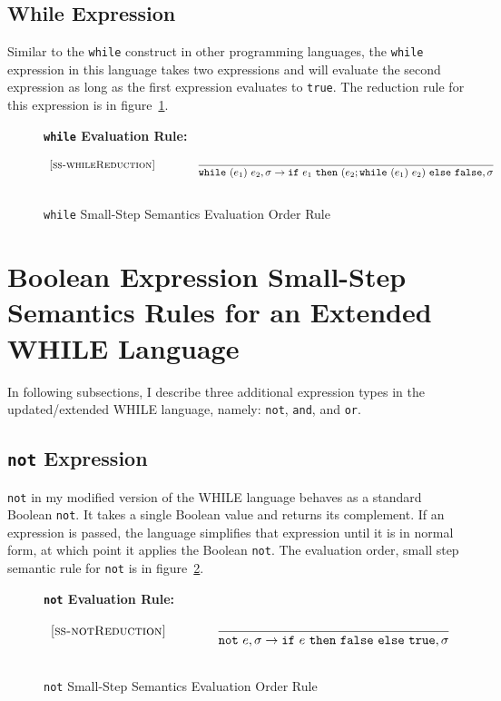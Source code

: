 \documentclass{article}
\newcommand{\ife}[3]{\mbox{\tt if}~{#1}~\mbox{\tt then}~{#2}~\mbox{\tt else}~{#3}}
\newcommand{\whilee}[2]{\mbox{\tt while}~(#1)~#2}
\newcommand{\note}[1]{\mbox{\tt not}~#1}
\newcommand{\true}{\mbox{\tt true}}
\newcommand{\false}{\mbox{\tt false}}
\begin{document}
\subsection{While Expression}

Similar to the {\tt while} construct in other programming languages, the {\tt while} expression in this language takes two expressions and will evaluate the second expression as long as the first expression evaluates to \true.  The reduction rule for this expression is in figure~\ref{fig:whileRules}.

\begin{figure}[H]
\caption{{\tt while} Small-Step Semantics Evaluation Order Rule}
\label{fig:whileRules}
{\bf {\tt while} Evaluation Rule:} 
\[
\\
\begin{array}{r@{\qquad\qquad}l}
\ssrule{ss-whileReduction}{
}{
  \sstep{\whilee{e_1}{e_2}}{\sigma}{\ife{e_1}{(e_2;\whilee{e_1}{e_2})}{\false}}{\sigma}
}
\end{array}
\]
\end{figure}

\section{Boolean Expression Small-Step Semantics Rules for an Extended WHILE Language}


In following subsections, I describe three additional expression types in the updated/extended WHILE language, namely: {\tt not}, {\tt and}, and {\tt or}.  

\subsection{{\tt not} Expression}\label{subSec:not}

{\tt not} in my modified version of the WHILE language behaves as a standard Boolean {\tt not}.  It takes a single Boolean value and returns its complement.  If an expression is passed, the language simplifies that expression until it is in normal form, at which point it applies the Boolean {\tt not}.  The evaluation order, small step semantic rule for {\tt not} is in figure~\ref{fig:notRules}.

\begin{figure}[H]
\caption{{\tt not} Small-Step Semantics Evaluation Order Rule}
\label{fig:notRules}
{\bf {\tt not} Evaluation Rule:} 
\[
\\
\begin{array}{r@{\qquad\qquad}l}
\ssrule{ss-notReduction}{
}{
  \sstep{\note{e}}{\sigma}{\ife{e}{\false}{\true}}{\sigma}
}
\end{array}
\]
\end{figure}
\end{document}
